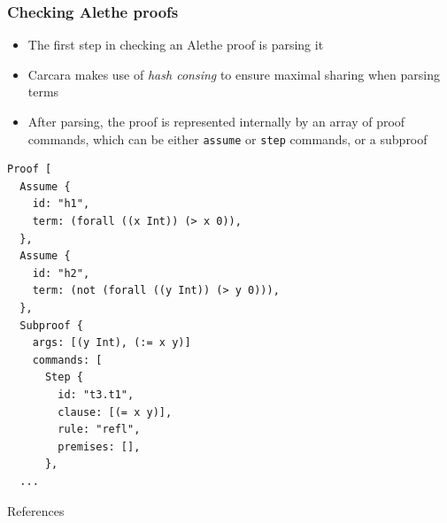 \documentclass[usepdftitle=false,aspectratio=169]{beamer}
\newcommand\vitem{\vfill\item}
\begin{document}
\begin{frame}[fragile]
  \frametitle{Checking Alethe proofs}
  \begin{minipage}{0.49 \textwidth}
  \begin{itemize}
    \vitem The first step in checking an Alethe proof is parsing it
    \vspace{2ex}
    \vitem Carcara makes use of \textit{hash consing} to ensure maximal sharing
    when parsing terms
    \vspace{2ex}
    \vitem After parsing, the proof is represented internally by an array of
    proof commands, which can be either \texttt{assume} or \texttt{step}
    commands, or a subproof
  \end{itemize}
  \end{minipage}
  \begin{minipage}{0.5 \textwidth}
    \vspace{-.35ex}
    \begin{verbatim}
Proof [
  Assume {
    id: "h1",
    term: (forall ((x Int)) (> x 0)),
  },
  Assume {
    id: "h2",
    term: (not (forall ((y Int)) (> y 0))),
  },
  Subproof {
    args: [(y Int), (:= x y)]
    commands: [
      Step {
        id: "t3.t1",
        clause: [(= x y)],
        rule: "refl",
        premises: [],
      },
  ...
    \end{verbatim}
  \end{minipage}
\end{frame}

\begin{frame}{References}
\printbibliography
\end{frame}
\end{document}
